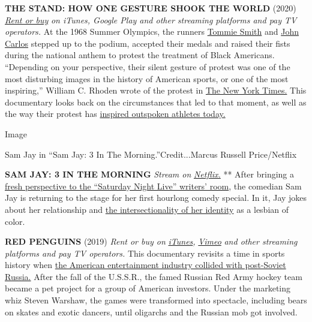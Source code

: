 \textbf{THE STAND: HOW ONE GESTURE SHOOK THE WORLD} (2020)
\href{https://tv.apple.com/us/movie/the-stand-how-one-gesture-shook-the-world/umc.cmc.hw5jhieqcimd8aiuxc8pnx1w}{\emph{Rent
or buy}} \emph{on iTunes, Google Play and other streaming platforms and
pay TV operators.} At the 1968 Summer Olympics, the runners
\href{https://www.nytimes.com/2020/06/13/sports/tommie-smith-protest-colin-kaepernick.html}{Tommie
Smith} and
\href{https://www.nytimes.com/2011/10/11/sports/john-carlos-of-68-olympics-protest-maintains-his-passion.html}{John
Carlos} stepped up to the podium, accepted their medals and raised their
fists during the national anthem to protest the treatment of Black
Americans. ``Depending on your perspective, their silent gesture of
protest was one of the most disturbing images in the history of American
sports, or one of the most inspiring,'' William C. Rhoden wrote of the
protest in
\href{https://www.nytimes.com/2016/07/18/sports/olympics/john-carlos-tommie-smith-committee-apology.html}{The
New York Times.} This documentary looks back on the circumstances that
led to that moment, as well as the way their protest has
\href{https://www.nytimes.com/2018/09/06/sports/kaepernick-nike-kneeling.html}{inspired
outspoken athletes today.}

Image

Sam Jay in ``Sam Jay: 3 In The Morning.''Credit...Marcus Russell
Price/Netflix

\textbf{SAM JAY: 3 IN THE MORNING} \emph{Stream on}
\href{https://www.netflix.com/search?q=sam\%20jay\&jbv=81078802}{\emph{Netflix.}}
** After bringing a
\href{https://www.vice.com/en_us/article/ywnn3x/snls-kenan-thompson-and-sam-jay-want-to-make-everyone-laugh}{fresh
perspective to the ``Saturday Night Live'' writers' room}, the comedian
Sam Jay is returning to the stage for her first hourlong comedy special.
In it, Jay jokes about her relationship and
\href{https://www.youtube.com/watch?v=D2EcvFfzu-o}{the intersectionality
of her identity} as a lesbian of color.

\textbf{RED PENGUINS} (2019) \emph{Rent or buy on}
\href{https://tv.apple.com/us/movie/red-penguins/umc.cmc.1a55rxdxlme2cwu9ylp4edln7}{\emph{iTunes}}\emph{,}
\href{https://vimeo.com/ondemand/redpenguins}{\emph{Vimeo}} \emph{and
other streaming platforms and pay TV operators.} This documentary
revisits a time in sports history when
\href{https://www.nytimes.com/1994/03/28/sports/hockey-from-russia-with-endorsements.html}{the
American entertainment industry collided with post-Soviet Russia.} After
the fall of the U.S.S.R., the famed Russian Red Army hockey team became
a pet project for a group of American investors. Under the marketing
whiz Steven Warshaw, the games were transformed into spectacle,
including bears on skates and exotic dancers, until oligarchs and the
Russian mob got involved.

